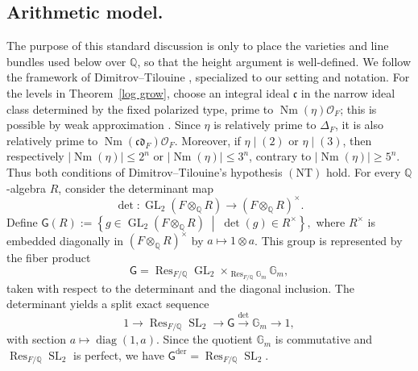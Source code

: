 \documentclass[12 pt]{amsart}
\theoremstyle{definition}
\newcommand{\Nm}{\operatorname{Nm}}
\begin{document}
\subsection*{Arithmetic model.}
The purpose of this standard discussion is only to place the varieties and line bundles used below over $\mathbb Q$, so that the height argument is well-defined.
We follow the framework of Dimitrov--Tilouine
\cite[\S1]{dimitrovtilouine}, specialized to our setting and notation.
For the levels in Theorem~\ref{log grow}, choose an integral ideal
\(\mathfrak c\) in the narrow ideal class determined by the fixed
polarized type, prime to \(\Nm(\eta)\mathcal O_F\); this is possible by
weak approximation \cite[Remark~1.5]{dimitrovtilouine}. Since \(\eta\)
is relatively prime to \(\Delta_F\), it is also relatively prime to
\(\Nm(\mathfrak c\mathfrak d_F)\mathcal O_F\). Moreover, if
\(\eta\mid(2)\) or \(\eta\mid(3)\), then respectively
\(|\Nm(\eta)|\leq2^n\) or \(|\Nm(\eta)|\leq3^n\), contrary to
\(|\Nm(\eta)|\geq5^n\). Thus both conditions of Dimitrov--Tilouine's
hypothesis \((\mathrm{NT})\) hold.
For every $\mathbb Q$-algebra $R$, consider the determinant map
\[
\det\colon \operatorname{GL}_2(F\otimes_{\mathbb Q}R)
\longrightarrow (F\otimes_{\mathbb Q}R)^\times.
\]
Define
\(
\mathsf G(R)
:=
\left\{
g\in\operatorname{GL}_2(F\otimes_{\mathbb Q}R)
\;\middle|\;
\det(g)\in R^\times
\right\},
\)
where $R^\times$ is embedded diagonally in $(F\otimes_{\mathbb Q}R)^\times$ by $a\mapsto 1\otimes a$. This group is represented by the fiber product
\[
\mathsf G
=
\operatorname{Res}_{F/\mathbb Q}\operatorname{GL}_2
\times_{\operatorname{Res}_{F/\mathbb Q}\mathbb G_m}
\mathbb G_m,
\]
taken with respect to the determinant and the diagonal inclusion. The determinant yields a split exact sequence
\[
1\longrightarrow \operatorname{Res}_{F/\mathbb Q}\operatorname{SL}_2
\longrightarrow \mathsf G
\xrightarrow{\det}\mathbb G_m
\longrightarrow 1,
\]
with section \(a\mapsto \operatorname{diag}(1,a)\).
Since the quotient $\mathbb G_m$ is
commutative and $\operatorname{Res}_{F/\mathbb Q}\operatorname{SL}_2$
is perfect, we have
\(
\mathsf G^{\mathrm{der}}
=
\operatorname{Res}_{F/\mathbb Q}\operatorname{SL}_2.
\)
\end{document}
